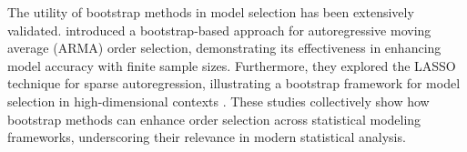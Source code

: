 \documentclass[review,a4paper,fleqn,3p,11pt,authoryear]{elsarticle}
\begin{document}
The utility of bootstrap methods in model selection has been extensively validated. \citet{fenga2011bootstrap} introduced a bootstrap-based approach for autoregressive moving average (ARMA) order selection, demonstrating its effectiveness in enhancing model accuracy with finite sample sizes. Furthermore, they explored the LASSO technique for sparse autoregression, illustrating a bootstrap framework for model selection in high-dimensional contexts \citep{fenga2017lasso}. These studies collectively show how bootstrap methods can enhance order selection across statistical modeling frameworks, underscoring their relevance in modern statistical analysis.

\end{document}
